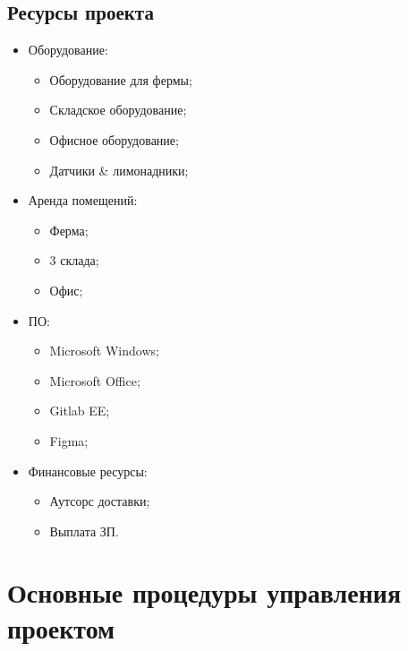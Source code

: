 \documentclass[a4paper,10pt]{article}
\begin{document}
\subsection{Ресурсы проекта}


    \begin{itemize}
        \item Оборудование:
            \begin{itemize}
                \item Оборудование для фермы;
                \item Складское оборудование;
                \item Офисное оборудование;
                \item Датчики \& лимонадники;
            \end{itemize}

        \item Аренда помещений:
            \begin{itemize}
                \item Ферма;
                \item 3 склада;
                \item Офис;
            \end{itemize}

        \item ПО:
            \begin{itemize}
                \item Microsoft Windows;
                \item Microsoft Office;
                \item Gitlab EE;
                \item Figma;
            \end{itemize}

        \item Финансовые ресурсы:
            \begin{itemize}
                \item Аутсорс доставки;
                \item Выплата ЗП.
            \end{itemize}

    \end{itemize}


\section{Основные процедуры управления проектом}
\end{document}
